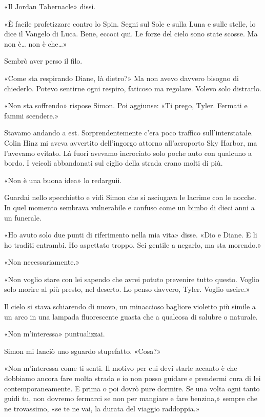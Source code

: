«Il Jordan Tabernacle» dissi.

«È facile profetizzare contro lo Spin. Segni sul Sole e sulla Luna e
sulle stelle, lo dice il Vangelo di Luca. Bene, eccoci qui. Le forze del
cielo sono state scosse. Ma non è\ldots{} non è che\ldots»

Sembrò aver perso il filo.

«Come sta respirando Diane, là dietro?» Ma non avevo davvero bisogno di
chiederlo. Potevo sentirne ogni respiro, faticoso ma regolare. Volevo
solo distrarlo.

«Non sta soffrendo» rispose Simon. Poi aggiunse: «Ti prego, Tyler.
Fermati e fammi scendere.»

Stavamo andando a est. Sorprendentemente c'era poco traffico
sull'interstatale. Colin Hinz mi aveva avvertito dell'ingorgo attorno
all'aeroporto Sky Harbor, ma l'avevamo evitato. Là fuori avevamo
incrociato solo poche auto con qualcuno a bordo. I veicoli abbandonati
sul ciglio della strada erano molti di più.

«Non è una buona idea» lo redarguii.

Guardai nello specchietto e vidi Simon che si asciugava le lacrime con
le nocche. In quel momento sembrava vulnerabile e confuso come un bimbo
di dieci anni a un funerale.

«Ho avuto solo due punti di riferimento nella mia vita» disse. «Dio e
Diane. E li ho traditi entrambi. Ho aspettato troppo. Sei gentile a
negarlo, ma sta morendo.»

«Non necessariamente.»

«Non voglio stare con lei sapendo che avrei potuto prevenire tutto
questo. Voglio solo morire al più presto, nel deserto. Lo penso davvero,
Tyler. Voglio uscire.»

Il cielo si stava schiarendo di nuovo, un minaccioso bagliore violetto
più simile a un arco in una lampada fluorescente guasta che a qualcosa
di salubre o naturale.

«Non m'interessa» puntualizzai.

Simon mi lanciò uno sguardo stupefatto. «Cosa?»

«Non m'interessa come ti senti. Il motivo per cui devi starle accanto è
che dobbiamo ancora fare molta strada e io non posso guidare e prendermi
cura di lei contemporaneamente. E prima o poi dovrò pure dormire. Se una
volta ogni tanto guidi tu, non dovremo fermarci se non per mangiare e
fare benzina,» sempre che ne trovassimo, «se te ne vai, la durata del
viaggio raddoppia.»

